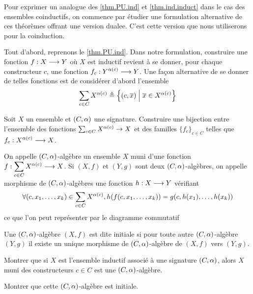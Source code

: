 \begin{problem}[La coinduction]
  
  \noindent
  Pour exprimer un analogue des \cref{thm.PU.ind} et
  \cref{thm.ind.induct} dans le cas des ensembles coinductifs, on commence par
  étudier une formulation alternative de ces théorèmes offrant une version
  dualee. C'est cette version que nous utiliserons pour la coinduction.
  
  \noindent
  Tout d'abord, reprenons le \cref{thm.PU.ind}. Dans notre formulation,
  construire une fonction $f : \displaystyle X \longrightarrow Y$ où $X$ est inductif revient
  à se donner,
  pour chaque constructeur $c$, une fonction
  $f_c : \displaystyle Y^{\alpha(c)} \longrightarrow Y$.
  Une façon alternative de se donner de telles fonctions est de considérer
  d'abord l'ensemble
  \[\sum_{c \in C} X^{\alpha(c)} \triangleq
  \left\{ (c,\overline{x}) \;\middle\vert\; \overline{x} \in X^{\alpha(c)} \right\}\]
  
  \begin{pbQuest}
  \item Soit $X$ un ensemble et $(C,\alpha)$ une signature. Construire une
    bijection entre l'ensemble des fonctions $\sum_{c \in C} X^{\alpha(c)} \to X$
    et des familles $\{f_c\}_{c \in C}$ telles que
    $f_c : \displaystyle X^{\alpha(c)} \longrightarrow X$.
  \end{pbQuest}
  
  \noindent
  On appelle $(C,\alpha)$-algèbre un ensemble $X$ muni d'une fonction
  $f : \displaystyle \sum_{c\in C} X^{\alpha(c)} \longrightarrow X$.
  Si $(X,f)$ et $(Y,g)$ sont deux
  $(C,\alpha)$-algèbres, on appelle morphisme de $(C,\alpha)$-algèbres une
  fonction $h : \displaystyle X \longrightarrow Y$ vérifiant
  \[\forall (c, x_1,\ldots,x_k) \in \sum_{c \in C} X^{\alpha(c)},
  h(f(c, x_1,\ldots,x_k)) = g(c,h(x_1),\ldots,h(x_k))\]
  ce que l'on peut représenter par le diagramme commutatif
  \begin{center}
  \end{center}
  
  \noindent
  Une $(C,\alpha)$-algèbre $(X,f)$ est dite initiale si pour toute autre
  $(C,\alpha)$-algèbre $(Y,g)$ il existe un unique morphisme de
  $(C,\alpha)$-algèbre de $(X,f)$ vers $(Y,g)$.
  
  \begin{pbQuest}[resume]
  \item Montrer que si $X$ est l'ensemble inductif associé à une signature
    $(C,\alpha)$, alors $X$ muni des constructeurs $c \in C$ est une
    $(C,\alpha)$-algèbre.
  \item Montrer que cette $(C,\alpha)$-algèbre est initiale.
  \end{pbQuest}


\end{problem}

